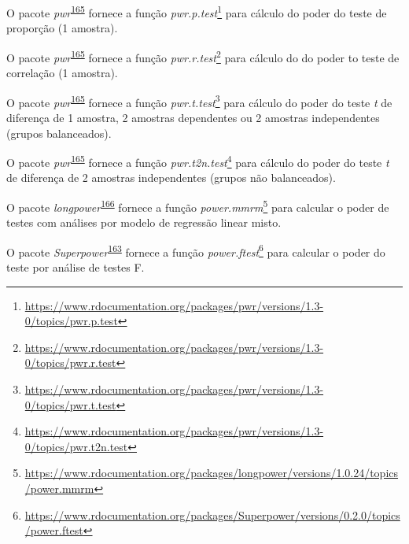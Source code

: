 \documentclass[
  a4paper,
]{book}
\renewcommand{\href}[2]{#2\footnote{\url{#1}}}
\newenvironment{infobox}[1]
  {
  \begin{itemize}
  \renewcommand{\labelitemi}{
    \raisebox{-.7\height}[0pt][0pt]{
      {\setkeys{Gin}{width=3em,keepaspectratio}
        \texttt{[image: \#1]}}
    }
  }
  \setlength{\fboxsep}{1em}
  \begin{blackbox}
  \item
  }
  {
  \end{blackbox}
  \end{itemize}
  }
\begin{document}
\begin{infobox}{images/Rlogo}
O pacote \emph{pwr}\textsuperscript{\protect\hyperlink{ref-pwr}{165}} fornece a função \href{https://www.rdocumentation.org/packages/pwr/versions/1.3-0/topics/pwr.p.test}{\emph{pwr.p.test}} para cálculo do poder do teste de proporção (1 amostra).

\end{infobox}

\begin{infobox}{images/Rlogo}
O pacote \emph{pwr}\textsuperscript{\protect\hyperlink{ref-pwr}{165}} fornece a função \href{https://www.rdocumentation.org/packages/pwr/versions/1.3-0/topics/pwr.r.test}{\emph{pwr.r.test}} para cálculo do do poder to teste de correlação (1 amostra).

\end{infobox}

\begin{infobox}{images/Rlogo}
O pacote \emph{pwr}\textsuperscript{\protect\hyperlink{ref-pwr}{165}} fornece a função \href{https://www.rdocumentation.org/packages/pwr/versions/1.3-0/topics/pwr.t.test}{\emph{pwr.t.test}} para cálculo do poder do teste \emph{t} de diferença de 1 amostra, 2 amostras dependentes ou 2 amostras independentes (grupos balanceados).

\end{infobox}

\begin{infobox}{images/Rlogo}
O pacote \emph{pwr}\textsuperscript{\protect\hyperlink{ref-pwr}{165}} fornece a função \href{https://www.rdocumentation.org/packages/pwr/versions/1.3-0/topics/pwr.t2n.test}{\emph{pwr.t2n.test}} para cálculo do poder do teste \emph{t} de diferença de 2 amostras independentes (grupos não balanceados).

\end{infobox}

\begin{infobox}{images/Rlogo}
O pacote \emph{longpower}\textsuperscript{\protect\hyperlink{ref-longpower}{166}} fornece a função \href{https://www.rdocumentation.org/packages/longpower/versions/1.0.24/topics/power.mmrm}{\emph{power.mmrm}} para calcular o poder de testes com análises por modelo de regressão linear misto.

\end{infobox}

\begin{infobox}{images/Rlogo}
O pacote \emph{Superpower}\textsuperscript{\protect\hyperlink{ref-Superpower}{163}} fornece a função \href{https://www.rdocumentation.org/packages/Superpower/versions/0.2.0/topics/power.ftest}{\emph{power.ftest}} para calcular o poder do teste por análise de testes F.

\end{infobox}
\end{document}
